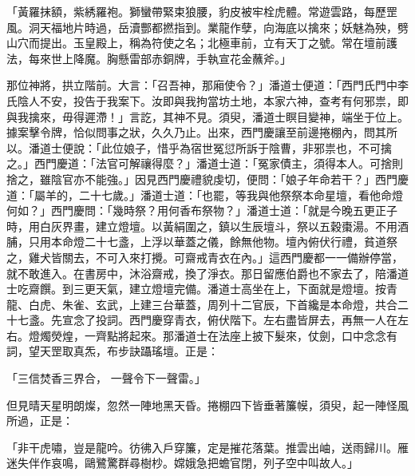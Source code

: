 「黃羅抹額，紫綉羅袍。獅蠻帶緊束狼腰，豹皮被牢栓虎體。常遊雲路，每歷罡風。洞天福地片時過，岳瀆酆都撚指到。業龍作孽，向海底以擒來；妖魅為殃，劈山穴而提出。玉皇殿上，稱為符使之名；北極車前，立有天丁之號。常在壇前護法，每來世上降魔。胸懸雷部赤銅牌，手執宣花金蘸斧。」

那位神將，拱立階前。大言：「召吾神，那廂使令？」潘道士便道：「西門氏門中李氏陰人不安，投告于我案下。汝即與我拘當坊土地，本家六神，查考有何邪祟，即與我擒來，毋得遲滯！」言訖，其神不見。須臾，潘道士瞑目變神，端坐于位上。據案擊令牌，恰似問事之狀，久久乃止。出來，西門慶讓至前邊捲棚內，問其所以。潘道士便說：「此位娘子，惜乎為宿世冤愆所訴于陰曹，非邪祟也，不可擒之。」西門慶道：「法官可解禳得麼？」潘道士道：「冤家債主，須得本人。可捨則捨之，雖陰官亦不能強。」因見西門慶禮貌虔切，便問：「娘子年命若干？」西門慶道：「屬羊的，二十七歲。」潘道士道：「也罷，等我與他祭祭本命星壇，看他命燈何如？」西門慶問：「幾時祭？用何香布祭物？」潘道士道：「就是今晚五更正子時，用白灰界畫，建立燈壇。以黃絹圍之，鎮以生辰壇斗，祭以五穀棗湯。不用酒脯，只用本命燈二十七盞，上浮以華蓋之儀，餘無他物。壇內俯伏行禮，貧道祭之，雞犬皆關去，不可入來打攪。可齋戒青衣在內。」這西門慶都一一備辦停當，就不敢進入。在書房中，沐浴齋戒，換了淨衣。那日留應伯爵也不家去了，陪潘道士吃齋饌。到三更天氣，建立燈壇完備。潘道士高坐在上，下面就是燈壇。按青龍、白虎、朱雀、玄武，上建三台華蓋，周列十二官辰，下首纔是本命燈，共合二十七盞。先宣念了投詞。西門慶穿青衣，俯伏階下。左右盡皆屏去，再無一人在左右。燈燭熒煌，一齊點將起來。那潘道士在法座上披下髮來，仗劍，口中念念有詞，望天罡取真炁，布步訣躡瑤壇。正是：

「三信焚香三界合，  一聲令下一聲雷。」

但見晴天星明朗燦，忽然一陣地黑天昏。捲棚四下皆垂著簾幙，須臾，起一陣怪風所過，正是：

「非干虎嘯，豈是龍吟。彷彿入戶穿簾，定是摧花落葉。推雲出岫，送雨歸川。雁迷失伴作哀鳴，鷗鷺驚群尋樹杪。嫦娥急把蟾官閉，列子空中叫故人。」

